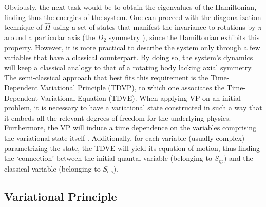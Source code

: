 Obviously, the next task would be to obtain the eigenvalues of the Hamiltonian, finding thus the energies of the system. One can proceed with the diagonalization technique of $\hat{H}$ using a set of states that manifest the invariance to rotations by $\pi$ around a particular axis (the $D_2$ symmetry \cite{bohr1998nuclear}), since the Hamiltonian exhibits this property. However, it is more practical to describe the system only through a few variables that have a classical counterpart. By doing so, the system's dynamics will keep a classical analogy to that of a rotating body lacking axial symmetry. The semi-classical approach that best fits this requirement is the Time-Dependent Variational Principle (TDVP), to which one associates the Time-Dependent Variational Equation (TDVE). When applying VP on an initial problem, it is necessary to have a variational state constructed in such a way that it embeds all the relevant degrees of freedom for the underlying physics. Furthermore, the VP will induce a time dependence on the variables comprising the variational state itself \cite{budaca2018tilted}. Additionally, for each variable (usually complex) parametrizing the state, the TDVE will yield its equation of motion, thus finding the `connection' between the initial quantal variable (belonging to $S_\text{qt})$ and the classical variable (belonging to $S_\text{cls}$).

\subsection{Variational Principle}


